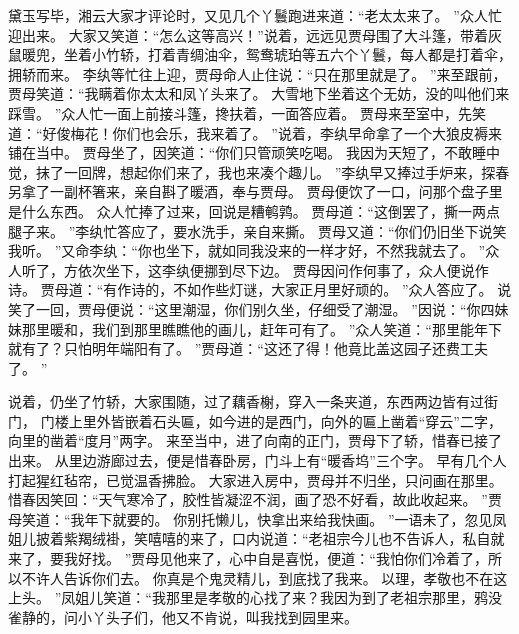 \hop
黛玉写毕，湘云大家才评论时，又见几个丫鬟跑进来道：“老太太来了。
”众人忙迎出来。
大家又笑道：“怎么这等高兴！”说着，远远见贾母围了大斗篷，带着灰鼠暖兜，坐着小竹轿，打着青绸油伞，鸳鸯琥珀等五六个丫鬟，每人都是打着伞，拥轿而来。
李纨等忙往上迎，贾母命人止住说：“只在那里就是了。
”来至跟前，贾母笑道：“我瞒着你太太和凤丫头来了。
大雪地下坐着这个无妨，没的叫他们来踩雪。
”众人忙一面上前接斗篷，搀扶着，一面答应着。
贾母来至室中，先笑道：“好俊梅花！你们也会乐，我来着了。
”说着，李纨早命拿了一个大狼皮褥来铺在当中。
贾母坐了，因笑道：“你们只管顽笑吃喝。
我因为天短了，不敢睡中觉，抹了一回牌，想起你们来了，我也来凑个趣儿。
”李纨早又捧过手炉来，探春另拿了一副杯箸来，亲自斟了暖酒，奉与贾母。
贾母便饮了一口，问那个盘子里是什么东西。
众人忙捧了过来，回说是糟鹌鹑。
贾母道：“这倒罢了，撕一两点腿子来。
”李纨忙答应了，要水洗手，亲自来撕。
贾母又道：“你们仍旧坐下说笑我听。
”又命李纨：“你也坐下，就如同我没来的一样才好，不然我就去了。
”众人听了，方依次坐下，这李纨便挪到尽下边。
贾母因问作何事了，众人便说作诗。
贾母道：“有作诗的，不如作些灯谜，大家正月里好顽的。
”众人答应了。
说笑了一回，贾母便说：“这里潮湿，你们别久坐，仔细受了潮湿。
”因说：“你四妹妹那里暖和，我们到那里瞧瞧他的画儿，赶年可有了。
”众人笑道：“那里能年下就有了？只怕明年端阳有了。
”贾母道：“这还了得！他竟比盖这园子还费工夫了。
”\par
说着，仍坐了竹轿，大家围随，过了藕香榭，穿入一条夹道，东西两边皆有过街门，
门楼上里外皆嵌着石头匾，如今进的是西门，向外的匾上凿着“穿云”二字，向里的凿着“度月”两字。
来至当中，进了向南的正门，贾母下了轿，惜春已接了出来。
从里边游廊过去，便是惜春卧房，门斗上有“暖香坞”三个字。
早有几个人打起猩红毡帘，已觉温香拂脸。
大家进入房中，贾母并不归坐，只问画在那里。
惜春因笑回：“天气寒冷了，胶性皆凝涩不润，画了恐不好看，故此收起来。
”贾母笑道：“我年下就要的。
你别托懒儿，快拿出来给我快画。
”一语未了，忽见凤姐儿披着紫羯绒褂，笑嘻嘻的来了，口内说道：“老祖宗今儿也不告诉人，私自就来了，要我好找。
”贾母见他来了，心中自是喜悦，便道：“我怕你们冷着了，所以不许人告诉你们去。
你真是个鬼灵精儿，到底找了我来。
以理，孝敬也不在这上头。
”凤姐儿笑道：“我那里是孝敬的心找了来？我因为到了老祖宗那里，鸦没雀静的，问小丫头子们，他又不肯说，叫我找到园里来。
